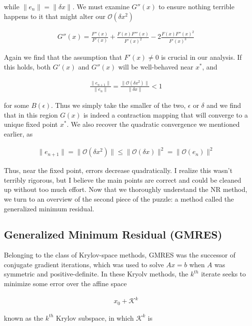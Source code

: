 \documentclass[11pt]{article}
\begin{document}
while $\| e_n \| = \| \delta x \|$.  We must examine $G''(x)$ to ensure nothing terrible happens to it that might alter our $\mathcal{O}(\delta x^2)$

\begin{align*}
  G''(x) = \frac{F''(x)}{F'(x)} + \frac{F(x)F'''(x)}{F'(x)^2} - 2 \frac{F(x)F''(x)^2}{F'(x)^3}
\end{align*}

Again we find that the assumption that $F'(x) \neq 0$ is crucial in our analysis. If this holds, both $G'(x)$ and $G''(x)$ will be well-behaved near $x^*$, and 

\begin{align*}
  \frac{\| e_{n+1} \|}{\| e_{n} \|} = \frac{\| \mathcal{O}(\delta x^2) \|}{\| \delta x \|} < 1
\end{align*}
 
for some $B(\epsilon)$. Thus we simply take the smaller of the two, $\epsilon$ or $\delta$ and we find that in this region $G(x)$ is indeed a contraction mapping that will converge to a unique fixed point $x^*$. We also recover the quadratic convergence we mentioned earlier, as

\begin{align*}
  \| e_{n+1} \| = \| \mathcal{O}(\delta x^2) \| \leq \| \mathcal{O}(\delta x) \|^2 = \| \mathcal{O}(e_n) \|^2
\end{align*}

Thus, near the fixed point, errors decrease quadratically. I realize this wasn't terribly rigorous, but I believe the main points are correct and could be cleaned up without too much effort. Now that we thoroughly understand the NR method, we turn to an overview of the second piece of the puzzle: a method called the generalized minimum residual.

\subsection{Generalized Minimum Residual (GMRES)}

Belonging to the class of Krylov-space methods, GMRES was the successor of conjugate gradient iterations, which was used to solve $Ax=b$ when $A$ was symmetric and positive-definite. In these Kryolv methods, the $k^{th}$ iterate seeks to minimize some error over the affine space

\begin{align*}
  x_0 + \mathcal{K}^k
\end{align*}

known as the $k^{th}$ Krylov subspace, in which $\mathcal{K}^k$ is
\end{document}
